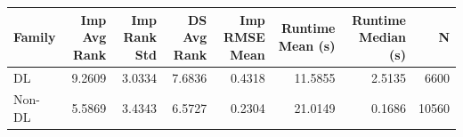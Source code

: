 \begin{tabular}{lrrrrrrr}
\toprule
Family & Imp Avg Rank & Imp Rank Std & DS Avg Rank & Imp RMSE Mean & Runtime Mean (s) & Runtime Median (s) & N \\
\midrule
DL & 9.2609 & 3.0334 & 7.6836 & 0.4318 & 11.5855 & 2.5135 & 6600 \\
Non-DL & 5.5869 & 3.4343 & 6.5727 & 0.2304 & 21.0149 & 0.1686 & 10560 \\
\bottomrule
\end{tabular}

